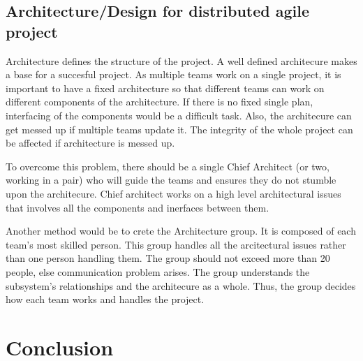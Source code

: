 \documentclass[sigconf]{acmart}
\begin{document}
\subsection{Architecture/Design for distributed agile project}
Architecture defines the structure of the project. A well defined architecure makes a base for a succesful project. As multiple teams work on a single project, it is important to have a fixed architecture so that different teams can work on different components of the architecture. If there is no fixed single plan, interfacing of the components would be a difficult task. Also, the architecure can get messed up if multiple teams update it. The integrity of the whole project can be affected if architecture is messed up.


To overcome this problem, there should be a single Chief Architect (or two, working in a pair) who will guide the teams and ensures they do not stumble upon the architecure. Chief architect works on a high level architectural issues that involves all the components and inerfaces between them. 


Another method would be to crete the Architecture group. It is composed of each team's most skilled person. This group handles all the arcitectural issues rather than one person handling them. The group should not exceed more than 20 people, else communication problem arises. The group understands the subsystem's relationships and the architecure as a whole. Thus, the group decides how each team works and handles the project. 


\section{Conclusion}


%

% 
\end{document}
